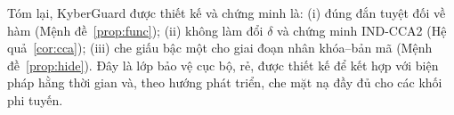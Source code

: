 \documentclass[../LuanVan.tex]{subfiles}
\begin{document}
Tóm lại, KyberGuard được thiết kế và chứng minh là: (i) đúng đắn tuyệt đối về hàm (Mệnh đề~\ref{prop:func}); (ii) không làm đổi $\delta$ và chứng minh IND-CCA2 (Hệ quả~\ref{cor:cca}); (iii) che giấu bậc một cho giai đoạn nhân khóa--bản mã (Mệnh đề~\ref{prop:hide}). Đây là lớp bảo vệ cục bộ, rẻ, được thiết kế để kết hợp với biện pháp hằng thời gian và, theo hướng phát triển, che mặt nạ đầy đủ cho các khối phi tuyến.
 
\end{document}
